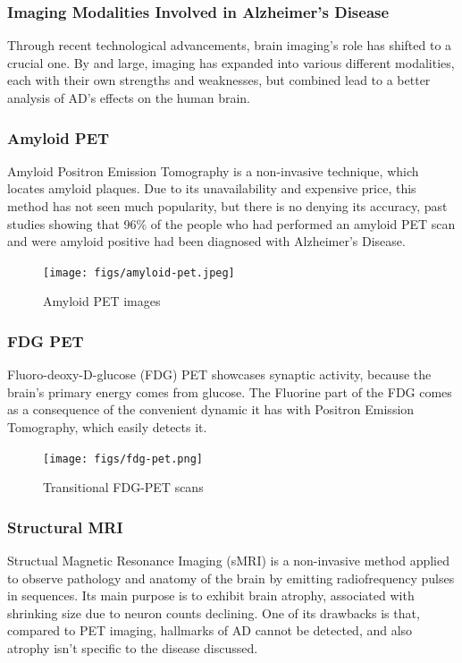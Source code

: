 \documentclass[a4paper, 12pt]{article}
\begin{document}

\subsubsection{Imaging Modalities Involved in Alzheimer's Disease} %
Through recent technological advancements, brain imaging's role has shifted to a crucial one. By and large, imaging has
expanded into various different modalities, each with their own strengths and weaknesses, but combined lead to a better
analysis of AD's effects on the human brain. \cite{Johnson2012BrainII}

\subsubsection*{Amyloid PET} %
Amyloid Positron Emission Tomography is a non-invasive technique, which locates amyloid plaques.
Due to its unavailability and expensive price, this method has not seen much popularity, but
there is no denying its accuracy, past studies showing that 96\% of the people who had performed an
amyloid PET scan and were amyloid positive had been diagnosed with Alzheimer's Disease.\\
\cite{Johnson2012BrainII}

\begin{figure}[htbp]
    \centering
    \texttt{[image: figs/amyloid-pet.jpeg]}
    \caption{Amyloid PET images}
    \label{fig:amyloid-pet}
\end{figure}

\subsubsection*{FDG PET} %
Fluoro-deoxy-D-glucose (FDG) PET showcases synaptic activity, because the brain's primary energy comes from glucose.
The Fluorine part of the FDG comes as a consequence of the convenient dynamic it has with Positron Emission Tomography,
which easily detects it.

\begin{figure}[htbp]
    \centering
    \texttt{[image: figs/fdg-pet.png]}
    \caption{Transitional FDG-PET scans}
    \label{fig:fdg-pet}
\end{figure}

\subsubsection*{Structural MRI} %
Structual Magnetic Resonance Imaging (sMRI) is a non-invasive method applied to observe pathology and anatomy of the brain
by emitting radiofrequency pulses in sequences. Its main purpose is to exhibit brain atrophy, associated with shrinking size
due to neuron counts declining. One of its drawbacks is that, compared to PET imaging, hallmarks of AD cannot be detected,
and also atrophy isn't specific to the disease discussed.
\end{document}

